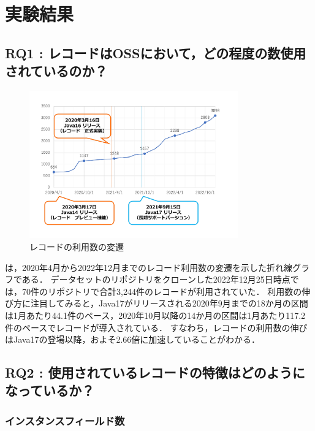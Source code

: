 \section{実験結果\label{result}}

\subsection{RQ1 : レコードはOSSにおいて，どの程度の数使用されているのか？\label{rq1_result}}

\begin{figure}[t]
    \centering
    \includegraphics[width=90mm]{image/num_records.pdf}
    \caption{レコードの利用数の変遷}
    \label{num_records}
\end{figure}

は，2020年4月から2022年12月までのレコード利用数の変遷を示した折れ線グラフである．
データセットのリポジトリをクローンした2022年12月25日時点では，70件のリポジトリで合計3,244件のレコードが利用されていた．
利用数の伸び方に注目してみると，Java17がリリースされる2020年9月までの18か月の区間は1月あたり44.1件のペース，2020年10月以降の14か月の区間は1月あたり117.2件のペースでレコードが導入されている．
すなわち，レコードの利用数の伸びはJava17の登場以降，およそ2.66倍に加速していることがわかる．

\subsection{RQ2 : 使用されているレコードの特徴はどのようになっているか？\label{rq2_result}}
\subsubsection{インスタンスフィールド数\label{num_instance_fields}}

